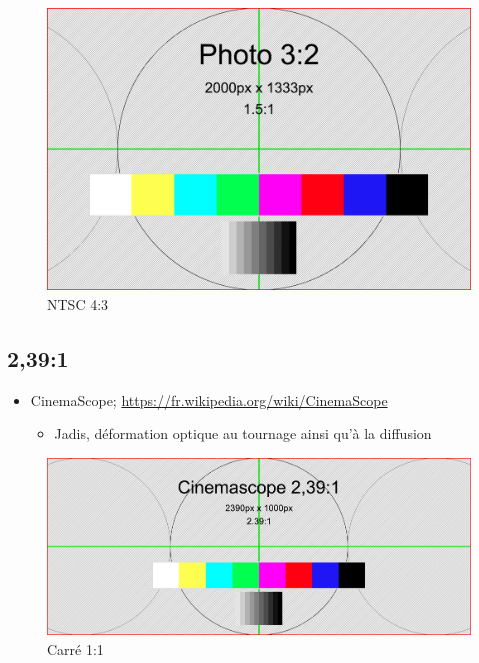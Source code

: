 \documentclass[
  french,
]{book}
\providecommand{\tightlist}{%
  \setlength{\itemsep}{0pt}\setlength{\parskip}{0pt}}
\begin{document}
\begin{figure}
\centering
\includegraphics{medias/lexique/Photo_3_2_2000x1333.png}
\caption{NTSC 4:3}
\end{figure}

\hypertarget{section-4}{%
\subsection{2,39:1}\label{section-4}}

\begin{itemize}
\tightlist
\item
  CinemaScope; \url{https://fr.wikipedia.org/wiki/CinemaScope}

  \begin{itemize}
  \tightlist
  \item
    Jadis, déformation optique au tournage ainsi qu'à la diffusion
  \end{itemize}
\end{itemize}

\begin{figure}
\centering
\includegraphics{medias/lexique/Cinemascope_2_39_1_2390x1000.png}
\caption{Carré 1:1}
\end{figure}
\end{document}
